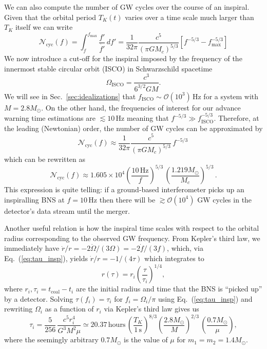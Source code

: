 \documentclass[prd,amsmath,amssymb,aps,floats,amsfonts,notitlepage,superscriptaddress,eqsecnum,nofootinbib,10pt]{revtex4-1}
\newcommand{\ord}{\mathcal{O}}
\newcommand{\f}{\frac}
\newcommand{\be}{\begin{equation}}
\newcommand{\ee}{\end{equation}}
\begin{document}
We can also compute the number of GW cycles over the course of an inspiral. Given that the orbital period $T_K(t)$ varies over a time scale much larger than $T_K$ itself
we can write
%
\be
\mathcal{N}_\text{cyc}(f) = \int_f^{f_\text{max}} \f{f'}{\dot{f'}}\, df' =\f{1}{32\pi} \f{c^5}{(\pi G M_c)^{5/3}}\left[ f^{-5/3}-f_\text{max}^{-5/3}\right] \label{eq:Ncyc1}
\ee
%
We now introduce a cut-off for the inspiral imposed by the frequency of the innermost stable circular orbit (ISCO) in Schwarzschild spacetime
\be
\Omega_\text{ISCO} = \f{c^3}{6^{3/2} G M} \label{eq:Sch_f_isco}.
\ee
%
%
We will see in Sec.~\ref{sec:idealizations} that $f_\text{ISCO} \sim \ord(10^3)\,$Hz for a system with $M =2.8 M_\odot$. 
On the other hand, the frequencies of interest for our advance warning time estimations are $\lesssim 10\,$Hz
meaning that $f^{-5/3} \gg f_\text{ISCO}^{-5/3}$. Therefore, at the leading (Newtonian) order, the number of GW cycles can be approximated by
%
\be
\mathcal{N}_\text{cyc}(f) \approx \f{1}{32\pi} \f{c^5}{(\pi G M_c)^{5/3}}\, f^{-5/3} \,  \label{eq:Ncyc2}
\ee
%
%
which can be rewritten as
\be
\mathcal{N}_\text{cyc}(f)\approx 1.605\times 10^4 \left(\f{10\,\text{Hz}}{f} \right)^{5/3}\,\left(\f{1.219 M_\odot}{M_c}\right)^{5/3}\label{eq:Ncyc3}\, .
\ee
%
This expression is quite telling: if a ground-based interferometer picks up an
inspiralling BNS at $f=10\,$Hz then there will be $\gtrsim \ord(10^4)$ GW cycles in the detector's data stream until the merger.

Another useful relation is how the inspiral time scales with respect to the orbital radius corresponding to the observed GW frequency.
From Kepler's third law, we immediately have $\dot{r}/r= -2\dot{\Omega}/(3\Omega)=-2\dot{f}/(3f)$, which, via Eq.~(\ref{eq:tau_insp}),
yields $\dot{r}/r= -1/(4\tau)$ which integrates to
%
\be
r(\tau)=r_i \left(\f{\tau}{\tau_i}\right)^{1/4}\label{eq:r_of_tau},
\ee
%
where $r_i, \tau_i=t_\text{coal}-t_i$ are the initial radius and time that the BNS
is ``picked up'' by a detector. Solving $\tau(f_i)=\tau_i$ for $f_i=\Omega_i/\pi$ using Eq.~(\ref{eq:tau_insp}) and rewriting $\Omega_i$ as a function of $r_i$ via
Kepler's third law gives us
%
\be
\tau_i = \f{5}{256}\, \f{c^5 r_i^4}{G^3 M^2 \mu}\simeq 20.37\,\text{hours}\, \left(\f{T_K}{1\,\text{s}}\right)^{8/3} \left(\f{2.8M_\odot}{M}\right)^{2/3}\,\left(\f{0.7M_\odot}{\mu}\right) \label{eq:tau_of_r},
\ee
%
where the seemingly arbitrary $0.7M_\odot$ is the value of $\mu$ for $m_1=m_2=1.4M_\odot$.
\end{document}
